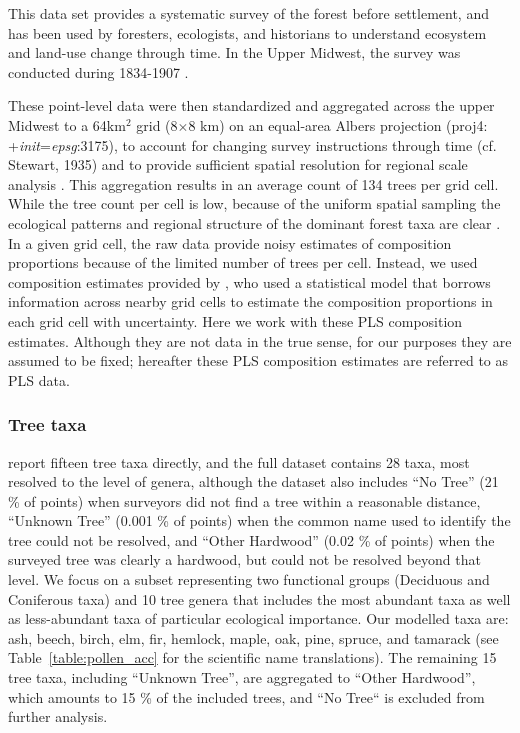 \documentclass[12pt]{article}
\begin{document}
This data set provides a systematic survey of the forest
before settlement, and has been used by foresters, ecologists, and
historians to understand ecosystem and land-use change through
time. In the Upper Midwest, the survey was conducted during 1834-1907
\citep{stewart1935public}. 

These point-level data were then standardized and aggregated across
the upper Midwest to a 64km$^2$ grid (8$\times$8 km) on an equal-area
Albers projection (proj4: +\textit{init}=\textit{epsg}:3175), to
account for changing survey instructions through time (cf. Stewart,
1935) and to provide sufficient spatial resolution for regional scale
analysis \citep{goring_witness}.  This aggregation results in an
average count of 134 trees per grid cell. While the tree count per
cell is low, because of the uniform spatial sampling the ecological
patterns and regional structure of the dominant forest taxa are clear
\citep{goring_witness}. In a given grid cell, the raw data provide
noisy estimates of composition proportions because of the limited
number of trees per cell. Instead, we used composition estimates
provided by \citet{paciorek2015}, who used a statistical model that
borrows information across nearby grid cells to estimate the
composition proportions in each grid cell with uncertainty. Here we
work with these PLS composition estimates. Although they are not data
in the true sense, for our purposes they are assumed to be fixed;
hereafter these PLS composition estimates are referred to as PLS data.

\subsubsection{Tree taxa}

\citet{goring_witness} report fifteen tree taxa directly, and the full
dataset contains 28 taxa, most resolved to the level of genera,
although the dataset also includes ``No Tree'' (21 \% of points) when
surveyors did not find a tree within a reasonable distance, ``Unknown
Tree'' (0.001 \% of points) when the common name used to identify the
tree could not be resolved, and ``Other Hardwood'' (0.02 \% of points)
when the surveyed tree was clearly a hardwood, but could not be
resolved beyond that level. We focus on a subset representing two
functional groups (Deciduous and Coniferous taxa) and 10 tree genera
that includes the most abundant taxa as well as less-abundant taxa of
particular ecological importance. Our modelled taxa are: ash, beech,
birch, elm, fir, hemlock, maple, oak, pine, spruce, and tamarack (see
Table~\ref{table:pollen_acc} for the scientific name
translations). The remaining 15 tree taxa, including ``Unknown Tree'',
are aggregated to ``Other Hardwood'', which amounts to 15 \% of the
included trees, and ``No Tree`` is excluded from further analysis.
\end{document}
